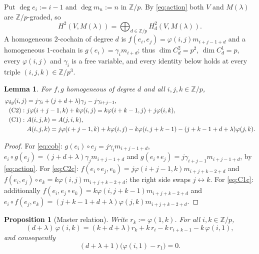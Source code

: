 \documentclass[11pt,reqno]{amsart}
\theoremstyle{plain}
\newtheorem{proposition}[theorem]{Proposition}
\newtheorem{lemma}[theorem]{Lemma}
\theoremstyle{definition}
\newcommand{\Ht}{H^2}
\newcommand{\Zp}{\mathbb{Z}/p}
\begin{document}
Put $\deg e_i:=i-1$ and $\deg m_n:=n$ in $\Zp$. By \eqref{eq:action} both $V$ and
$M(\lambda)$ are $\Zp$-graded, so
\[
\Ht(V,M(\lambda))=\bigoplus_{d\in\Zp}\Ht_d(V,M(\lambda)).
\]
A homogeneous $2$-cochain of degree $d$ is $f(e_i,e_j)=\varphi(i,j)m_{i+j-1+d}$ and a
homogeneous $1$-cochain is $g(e_i)=\gamma_i m_{i+d}$; thus $\dim C^2_d=p^2$,
$\dim C^1_d=p$, every $\varphi(i,j)$ and $\gamma_i$ is a free variable, and every identity
below holds at every triple $(i,j,k)\in\Zp^3$.

\begin{lemma}\label{lem:formulas}
For $f,g$ homogeneous of degree $d$ and all $i,j,k\in\Zp$,
\begin{align}
\varphi_{\delta g}(i,j)&=j\gamma_i+(j+d+\lambda)\gamma_j-j\gamma_{i+j-1},\label{eq:cob}\\
\text{\upshape(C2)}:\ & j\varphi(i+j-1,k)+k\varphi(i,j)=k\varphi(i+k-1,j)+j\varphi(i,k),
\label{eq:C2c}\\
\text{\upshape(C1)}:\ & A(i,j,k)=A(j,i,k),\nonumber\\
&A(i,j,k)=j\varphi(i+j-1,k)+k\varphi(i,j)-k\varphi(i,j+k-1)-(j+k-1+d+\lambda)\varphi(j,k).
\label{eq:C1c}
\end{align}
\end{lemma}

\begin{proof}
For \eqref{eq:cob}: $g(e_i)\circ e_j=j\gamma_i m_{i+j-1+d}$,
$e_i\circ g(e_j)=(j+d+\lambda)\gamma_j m_{i+j-1+d}$ and
$g(e_i\circ e_j)=j\gamma_{i+j-1}m_{i+j-1+d}$, by \eqref{eq:action}.
For \eqref{eq:C2c}: $f(e_i\circ e_j,e_k)=j\varphi(i+j-1,k)m_{i+j+k-2+d}$ and
$f(e_i,e_j)\circ e_k=k\varphi(i,j)m_{i+j+k-2+d}$; the right side swaps $j\leftrightarrow k$.
For \eqref{eq:C1c}: additionally $f(e_i,e_j\circ e_k)=k\varphi(i,j+k-1)m_{i+j+k-2+d}$ and
$e_i\circ f(e_j,e_k)=(j+k-1+d+\lambda)\varphi(j,k)m_{i+j+k-2+d}$.
\end{proof}

\begin{proposition}[Master relation]\label{prop:master}
Write $r_k:=\varphi(1,k)$. For all $i,k\in\Zp$,
\begin{equation}
(d+\lambda)\,\varphi(i,k)=(k+d+\lambda)r_k+k\,r_i-k\,r_{i+k-1}-k\,\varphi(i,1),
\label{eq:master}
\end{equation}
and consequently
\begin{equation}
(d+\lambda+1)\bigl(\varphi(i,1)-r_1\bigr)=0 .
\label{eq:master1}
\end{equation}
\end{proposition}
\end{document}
